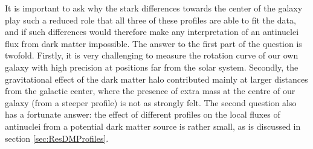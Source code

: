 It is important to ask why the stark differences towards the center of the galaxy play such a reduced role that all three of these profiles are able to fit the data, and if such differences would therefore make any interpretation of an antinuclei flux from dark matter impossible. The answer to the first part of the question is twofold. Firstly, it is very challenging to measure the rotation curve of our own galaxy with high precision at positions far from the solar system. Secondly, the gravitational effect of the dark matter halo contributed mainly at larger distances from the galactic center, where the presence of extra mass at the centre of our galaxy (from a steeper profile) is not as strongly felt. The second question also has a fortunate answer: the effect of different profiles on the local fluxes of antinuclei from a potential dark matter source is rather small, as is discussed in section \ref{sec:ResDMProfiles}. 
\\ \\

